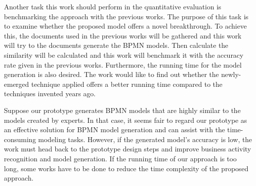 Another task this work should perform in the quantitative evaluation is benchmarking the approach with the previous works. The purpose of this task is to examine whether the proposed model offers a novel breakthrough. To achieve this, the documents used in the previous works will be gathered and this work will try to the documents generate the BPMN models. Then calculate the similarity will be calculated and this work will benchmark it with the accuracy rate given in the previous works. Furthermore, the running time for the model generation is also desired. The work would like to find out whether the newly-emerged technique applied offers a better running time compared to the techniques invented years ago. 

 Suppose our prototype generates BPMN models that are highly similar to the models created by experts. In that case, it seems fair to regard our prototype as an effective solution for BPMN model generation and can assist with the time-consuming modeling tasks. However, if the generated model's accuracy is low, the work must head back to the prototype design steps and improve business activity recognition and model generation. If the running time of our approach is too long, some works have to be done to reduce the time complexity of the proposed approach.